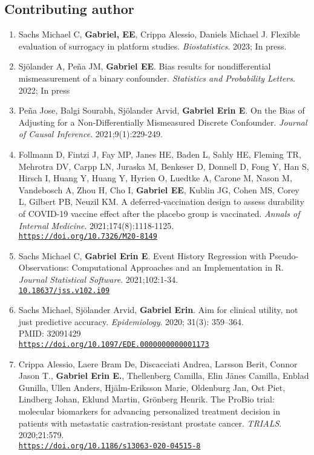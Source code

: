 \documentclass[12pt]{article}
\providecommand \url[1]{\href{#1}{#1}}
\renewcommand*\url[1]{\href{#1}{\texttt{#1}}}
\begin{document}
\subsection*{Contributing author}
\begin{enumerate}



\item Sachs Michael C, \textbf{Gabriel, EE}, Crippa  Alessio, Daniels Michael J. Flexible evaluation of surrogacy in platform studies. \emph{Biostatistics}. 2023; In press.


\item Sjölander A, Peña JM, \textbf{Gabriel EE}. Bias results for nondifferential mismeasurement of a binary confounder. \emph{Statistics and Probability Letters}. 2022; In press


\item Peña Jose, Balgi Sourabh,  Sjölander Arvid, \textbf{Gabriel Erin E}. On the Bias of Adjusting for a Non-Differentially Mismeasured Discrete Confounder. \emph{Journal of Causal Inference}. 2021;9(1):229-249.

\item Follmann D, Fintzi J, Fay MP, Janes HE, Baden L, Sahly HE, Fleming TR, Mehrotra DV, Carpp LN, Juraska M, Benkeser D, Donnell D, Fong Y, Han S, Hirsch I, Huang Y, Huang Y, Hyrien O, Luedtke A, Carone M, Nason M, Vandebosch A, Zhou H, Cho I, \textbf{Gabriel EE}, Kublin JG, Cohen MS, Corey L, Gilbert PB, Neuzil KM. A deferred-vaccination design to assess durability of COVID-19 vaccine effect after the placebo group is vaccinated. \emph{Annals of Internal Medicine}. 2021;174(8):1118-1125.\\
\url{https://doi.org/10.7326/M20-8149}


\item Sachs Michael C, \textbf{Gabriel Erin E}. Event History Regression with Pseudo-Observations: Computational Approaches and an Implementation in R. \emph{Journal Statistical Software}. 2021;102:1-34.\\
\url{10.18637/jss.v102.i09}


\item Sachs Michael, Sjölander Arvid, \textbf{Gabriel Erin}. Aim for clinical utility, not just predictive accuracy.  \emph{Epidemiology}. 2020; 31(3): 359–364.\\
PMID: 32091429\\
\url{https://doi.org/10.1097/EDE.0000000000001173}

\item Crippa Alessio,  Laere Bram De, Discacciati Andrea,  Larsson Berit,  Connor Jason T., \textbf{Gabriel Erin E.},  Thellenberg Camilla, Elin Jänes Camilla,  Enblad Gunilla,  Ullen Anders,  Hjälm-Eriksson Marie, Oldenburg  Jan,  Ost Piet,  Lindberg Johan, Eklund  Martin, Grönberg Henrik. The ProBio trial: molecular biomarkers for advancing personalized treatment decision in patients with metastatic castration-resistant prostate cancer. \emph{TRIALS}. 2020;21:579.\\
\url{https://doi.org/10.1186/s13063-020-04515-8}



\end{enumerate}
\end{document}
